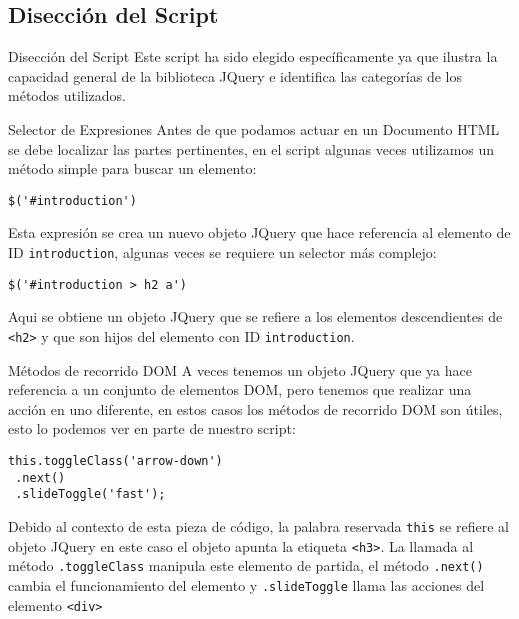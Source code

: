 \subsection{Disección del Script} %

\begin{frame}[fragile]{Disección del Script} %
Este script ha sido elegido específicamente ya que ilustra la capacidad general
de la biblioteca JQuery e identifica las categorías de los métodos utilizados.
\end{frame}

\begin{frame}[fragile]{Selector de Expresiones} %
    Antes de que podamos actuar en un Documento HTML se debe localizar las
    partes pertinentes,  en el script algunas veces utilizamos un método simple
    para buscar un elemento:
\begin{lstlisting}
$('#introduction')
\end{lstlisting}
    Esta expresión se crea un nuevo objeto JQuery que hace referencia al
    elemento de ID \texttt{introduction}, algunas veces se requiere un selector
    más complejo:
\begin{lstlisting}
$('#introduction > h2 a')
\end{lstlisting}
   Aqui se obtiene un objeto JQuery que se refiere a los elementos
   descendientes de \texttt{<h2>} y que son hijos del elemento con ID
   \texttt{introduction}.   
\end{frame}

\begin{frame}[fragile]{Métodos de recorrido DOM} %
    A veces tenemos un objeto JQuery que ya hace referencia a un conjunto de
    elementos DOM,  pero tenemos que realizar una acción en uno diferente,  en
    estos casos los métodos de recorrido DOM son útiles, esto lo podemos ver en
    parte de nuestro script:
\begin{lstlisting}
this.toggleClass('arrow-down')
 .next()
 .slideToggle('fast');
\end{lstlisting}
    Debido al contexto de esta pieza de código, la palabra reservada
    \texttt{this} se refiere al objeto JQuery en este caso el objeto apunta la
    etiqueta \texttt{<h3>}. La llamada al método \texttt{.toggleClass} manipula
    este elemento de partida,  el método \texttt{.next()} cambia el
    funcionamiento del elemento y
    \texttt{.slideToggle} llama las acciones del elemento \texttt{<div>}
\end{frame}

